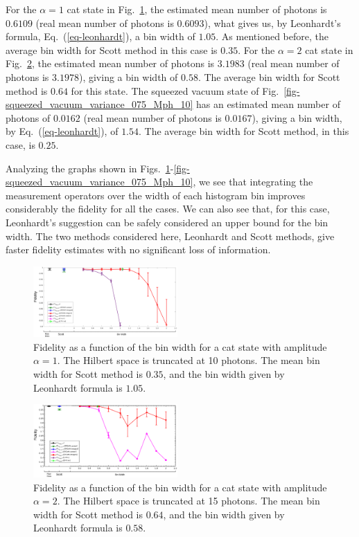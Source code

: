 \documentclass[
reprint,
superscriptaddress,
showpacs,
amsmath,
amssymb,
aps,
pra,
longbibliography
]{revtex4-1}
\begin{document}
For the $\alpha = 1$ cat state in Fig.~\ref{fig-Fidelity_vs_binwidth_catstate_Mph_10_alpha_1}, the estimated mean number of photons is $0.6109$ (real mean number of photons is $0.6093$), what gives us, by Leonhardt's formula, Eq.~(\ref{eq-leonhardt}), a bin width of $1.05$. As mentioned before, the average bin width for Scott method in this case is $0.35$. For the $\alpha = 2$ cat state in Fig.~\ref{fig-Fid_vs_binwidth_catstate_alpha_2_Mph_15}, the estimated mean number of photons is $3.1983$ (real mean number of photons is $3.1978$), giving a bin width of $0.58$. The average bin width for Scott method is $0.64$ for this state. The squeezed vacuum state of Fig.~\ref{fig-squeezed_vacuum_variance_075_Mph_10} has an estimated mean number of photons of
$0.0162$ (real mean number of photons is $0.0167$), giving a bin width, by Eq.~(\ref{eq-leonhardt}), of $1.54$. The average bin width for Scott method, in this case, is $0.25$.

Analyzing the graphs shown in Figs.~\ref{fig-Fidelity_vs_binwidth_catstate_Mph_10_alpha_1}-\ref{fig-squeezed_vacuum_variance_075_Mph_10}, we see that integrating the measurement operators over the width of each histogram bin improves considerably the fidelity for all the cases. We can also see that, for this case, Leonhardt's suggestion can be safely considered an upper bound for the bin width. The two methods considered here, Leonhardt and Scott methods, give faster fidelity estimates with no significant loss of information.
   
\begin{figure}[h]
\includegraphics[width=0.49\textwidth]{fid_vs_binwidth_catstate_alpha_1_mph_10.eps}
\caption{Fidelity as a function of the bin width for a cat state with amplitude
$\alpha = 1$. The Hilbert space is truncated at 10 photons. The mean bin width for Scott method is $0.35$, and the bin width given by Leonhardt formula is $1.05$.}
\label{fig-Fidelity_vs_binwidth_catstate_Mph_10_alpha_1}
\end{figure}

\begin{figure}[h]
\includegraphics[width=0.49\textwidth]{fidelity_vs_binwidth_catstate_alpha_2.eps}
\caption{Fidelity as a function of the bin width for a cat state with amplitude
$\alpha = 2$. The Hilbert space is truncated at 15 photons. The mean bin width for Scott method is $0.64$, and the bin width given by Leonhardt formula is $0.58$.}
\label{fig-Fid_vs_binwidth_catstate_alpha_2_Mph_15}
\end{figure}
\end{document}
